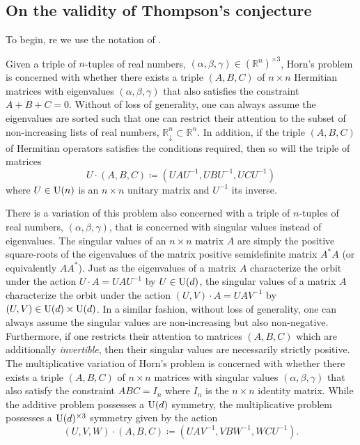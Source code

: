 \documentclass[notitlepage]{article}
\begin{document}

\subsection{On the validity of Thompson's conjecture}

To begin, re we use the notation of \citeauthor{speyer2005horn} \cite{speyer2005horn}.

Given a triple of $n$-tuples of real numbers, $(\alpha, \beta, \gamma) \in (\mathbb R^n)^{\times 3}$, Horn's problem is concerned with whether there exists a triple $(A,B,C)$ of $n\times n$ Hermitian matrices with eigenvalues $(\alpha, \beta, \gamma)$ that also satisfies the constraint $A+B+C=0$.
Without of loss of generality, one can always assume the eigenvalues are sorted such that one can restrict their attention to the subset of non-increasing lists of real numbers, $\mathbb R^{n}_{\downarrow} \subset \mathbb R^n$.
In addition, if the triple $(A,B,C)$ of Hermitian operators satisfies the conditions required, then so will the triple of matrices
\begin{equation}
    U\cdot (A,B,C) \coloneqq (UAU^{-1}, UBU^{-1}, UCU^{-1})
\end{equation}
where $U \in \operatorname{U}(n)$ is an $n\times n$ unitary matrix and $U^{-1}$ its inverse.

There is a variation of this problem also concerned with a triple of $n$-tuples of real numbers, $(\alpha, \beta, \gamma)$, that is concerned with singular values instead of eigenvalues.
The singular values of an $n\times n$ matrix $A$ are simply the positive square-roots of the eigenvalues of the matrix positive semidefinite matrix $A^{*}A$ (or equivalently $AA^{*}$).
Just as the eigenvalues of a matrix $A$ characterize the orbit under the action $U\cdot A = UAU^{-1}$ by $U \in \operatorname{U}(d)$, the singular values of a matrix $A$ characterize the orbit under the action $(U,V)\cdot A = UAV^{-1}$ by $(U,V)\in\operatorname{U}(d) \times \operatorname{U}(d)$.
In a similar fashion, without loss of generality, one can always assume the singular values are non-increasing but also non-negative.
Furthermore, if one restricts their attention to matrices $(A,B,C)$ which are additionally \textit{invertible}, then their singular values are necessarily strictly positive.
The multiplicative variation of Horn's problem is concerned with whether there exists a triple $(A,B,C)$ of $n\times n$ matrices with singular values $(\alpha,\beta,\gamma)$ that also satisfy the constraint $ABC = I_n$ where $I_n$ is the $n\times n$ identity matrix.
While the additive problem possesses a $\operatorname{U}(d)$ symmetry, the multiplicative problem possesses a $\operatorname{U}(d)^{\times 3}$ symmetry given by the action
\begin{equation}
    (U,V,W)\cdot (A,B,C) \coloneqq (UAV^{-1}, VBW^{-1}, WCU^{-1}).
\end{equation}
\end{document}
